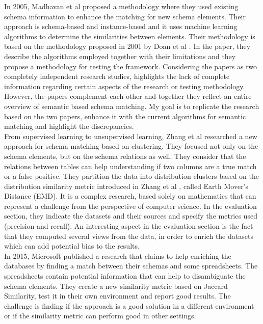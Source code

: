 \documentclass[a4paper]{article}
\begin{document}
In 2005, Madhavan et al \cite{madhavan2005corpus} proposed a methodology where they used existing schema information to enhance the matching for new schema elements. Their approach is schema-based and instance-based and it uses machine learning algorithms to determine the similarities between elements. Their methodology is based on the methodology proposed in 2001 by Doan et al \cite{doan2001reconciling}. In the paper, they describe the algorithms employed together with their limitations and they propose a methodology for testing the framework. Considering the papers as two completely independent research studies, highlights the lack of complete information regarding certain aspects of the research or testing methodology. However, the papers complement each other and together they reflect an entire overview of semantic based schema matching. My goal is to replicate the research based on the two papers, enhance it with the current algorithms for semantic matching and highlight the discrepancies. \\

From supervised learning to unsupervised learning, Zhang et al \cite{zhang2011automatic} researched a new approach for schema matching based on clustering. They focused not only on the schema elements, but on the schema relations as well. They consider that the relations between tables can help understanding if two columns are a true match or a false positive. They partition the data into distribution clusters based on the distribution similarity metric introduced in Zhang et al \cite{zhang2010multi}, called Earth Mover's Distance (EMD). It is a complex research, based solely on mathematics that can represent a challenge from the perspective of computer science. In the evaluation section, they indicate the datasets and their sources and specify the metrics used (precision and recall). An interesting aspect in the evaluation section is the fact that they computed several views from the data, in order to enrich the datasets which can add potential bias to the results. \\

In 2015, Microsoft \cite{cortez2015annotating} published a research that claims to help enriching the databases by finding a match between their schemas and some spreadsheets. The spreadsheets contain potential information that can help to disambiguate the schema elements. They create a new similarity metric based on Jaccard Similarity, test it in their own environment and report good results. The challenge is finding if the approach is a good solution in a different environment or if the similarity metric can perform good in other settings. \\
\end{document}
